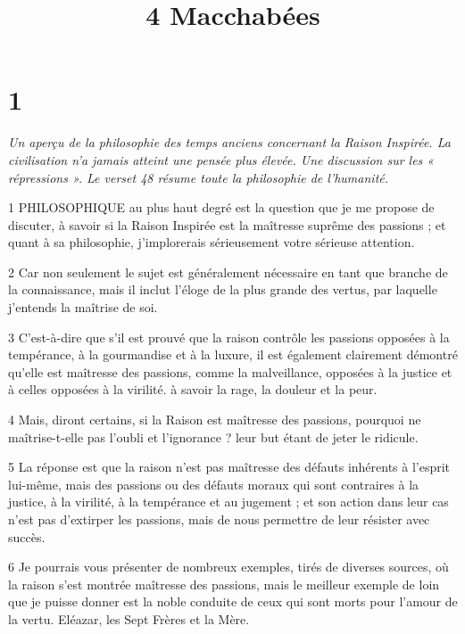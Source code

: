

\title{4 Macchabées}

\chapter{1}

\par \textit{Un aperçu de la philosophie des temps anciens concernant la Raison Inspirée. La civilisation n’a jamais atteint une pensée plus élevée. Une discussion sur les « répressions ». Le verset 48 résume toute la philosophie de l'humanité.}

\par 1 PHILOSOPHIQUE au plus haut degré est la question que je me propose de discuter, à savoir si la Raison Inspirée est la maîtresse suprême des passions ; et quant à sa philosophie, j'implorerais sérieusement votre sérieuse attention.

\par 2 Car non seulement le sujet est généralement nécessaire en tant que branche de la connaissance, mais il inclut l'éloge de la plus grande des vertus, par laquelle j'entends la maîtrise de soi.

\par 3 C'est-à-dire que s'il est prouvé que la raison contrôle les passions opposées à la tempérance, à la gourmandise et à la luxure, il est également clairement démontré qu'elle est maîtresse des passions, comme la malveillance, opposées à la justice et à celles opposées à la virilité. à savoir la rage, la douleur et la peur.

\par 4 Mais, diront certains, si la Raison est maîtresse des passions, pourquoi ne maîtrise-t-elle pas l'oubli et l'ignorance ? leur but étant de jeter le ridicule.

\par 5 La réponse est que la raison n'est pas maîtresse des défauts inhérents à l'esprit lui-même, mais des passions ou des défauts moraux qui sont contraires à la justice, à la virilité, à la tempérance et au jugement ; et son action dans leur cas n'est pas d'extirper les passions, mais de nous permettre de leur résister avec succès.

\par 6 Je pourrais vous présenter de nombreux exemples, tirés de diverses sources, où la raison s'est montrée maîtresse des passions, mais le meilleur exemple de loin que je puisse donner est la noble conduite de ceux qui sont morts pour l'amour de la vertu. Eléazar, les Sept Frères et la Mère.

